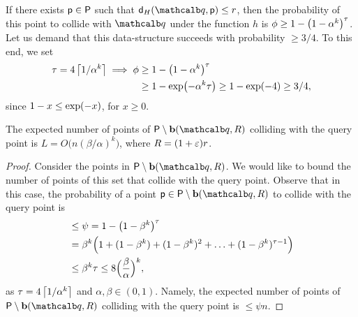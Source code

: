 If there exists $\mathsf{p} \in {\mathsf{P}}$ such that $\distH{\query}{\pnt}
\leq r$, then the probability of this point to collide with $\query$
under the function $h$ is $\phi \geq 1-\pth{1-\alpha^k}^\tau$. Let us
demand that this data-structure succeeds with probability $\geq
3/4$. To this end, we set
\begin{align}
    \tau%
    =%
    4 \ceil{1/\alpha^k} \implies \phi %
    &\geq %
    1-\bigl({1-\alpha^k}\bigr)^\tau%
    \nonumber
    \\
    &\geq
    1-\exp\bigl(-\alpha^k\tau \bigr) %
    \geq%
    1 - \exp\pth{-4} \geq 3/4,
    \eqlab{tau:value:3:4}
\end{align}
since $1-x \leq \exp\pth{-x}$, for $x \geq 0$.



\begin{lemma}
    The expected number of points of
    $\PntSet \setminus \Ball(\query, R)$ colliding with the query
    point is $L = O\bigl( n (\beta/\alpha)^k \bigr)$, where
    $R = (1+{\varepsilon})r$.
\end{lemma}

\begin{proof} 
    Consider the points in $\PntSet \setminus \Ball(\query, R)$. We
    would like to bound the number of points of this set that collide
    with the query point.  Observe that in this case, the probability
    of a point $\pnt \in \PntSet \setminus \Ball(\query, R)$ to
    collide with the query point is
    \begin{align*}
        &\leq%
        \psi%
        =%
        1-\bigl(1-\beta^k\bigr)^\tau%
        \\&=%
        \beta^k
        \Bigl( 1 + (1-\beta^k) +
        (1-\beta^k)^2 + \ldots + (1-\beta^k)^{\tau - 1}
        \Bigr)
      \\&\leq%
      \beta^k \tau%
      \leq%
      8 \Bigl(\frac{\beta}{\alpha}\Bigr)^k,
    \end{align*}
    as $\tau = 4\left\lceil {1/\alpha^k} \right\rceil$ and $\alpha,\beta\in (0,1)$.
    Namely, the expected number of points of $\PntSet \setminus
    \Ball(\query, R)$ colliding with the query point is $\leq \psi n$.
\end{proof}


